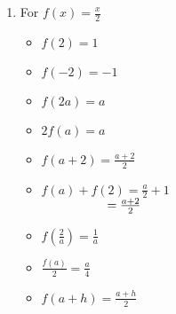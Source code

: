 \begin{enumerate}
\item For $f(x) = \frac{x}{2}$

\begin{multicols}{3}
\begin{itemize}

\item  $f(2) = 1$
\item  $f(-2) = -1$
\item  $f(2a) = a$

\end{itemize}
\end{multicols}

\begin{multicols}{3}
\begin{itemize}

\item  $2 f(a) = a$

\item $f(a+2) = \frac{a+2}{2}$

\vfill

\columnbreak

\item $f(a) + f(2) = \frac{a}{2}+ 1$ \\
      $\hphantom{f(a) + f(2)} = \frac{a+2}{2}$

\end{itemize}
\end{multicols}

\begin{multicols}{3}
\begin{itemize}

\item  $f \left( \frac{2}{a} \right) = \frac{1}{a}$

\vfill

\columnbreak

\item $\frac{f(a)}{2} =  \frac{a}{4}$

\vfill

\columnbreak


\item  $f(a + h) = \frac{a+h}{2}$

\end{itemize}
\end{multicols}




\setcounter{HW}{\value{enumi}}
\end{enumerate}

